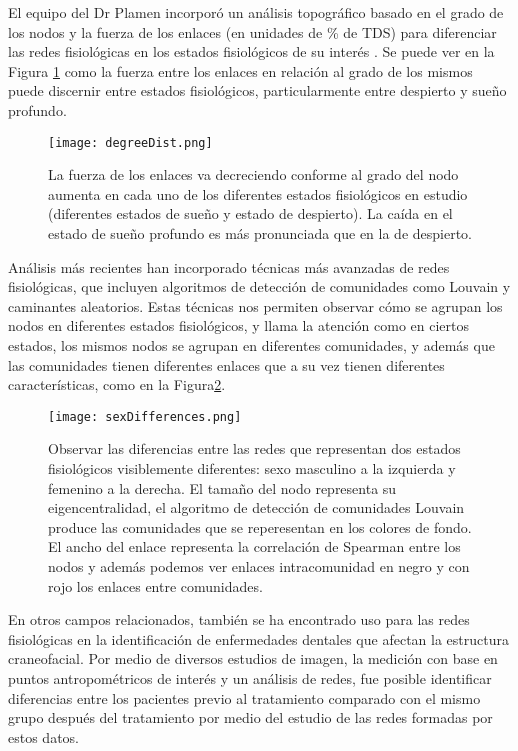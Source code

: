 \documentclass[twoside,twocolumn]{article}
\begin{document}
El equipo del Dr Plamen incorporó un análisis topográfico basado en el grado de los nodos y la fuerza de los enlaces (en unidades de \% de TDS) para diferenciar las redes fisiológicas en los estados fisiológicos de su interés \cite{bashan2012network}\cite{2015Plasticity}.
Se puede ver en la Figura \ref{fig:degreeDist} como la fuerza entre los enlaces en relación al grado de los mismos puede discernir entre estados fisiológicos, particularmente entre despierto y sueño profundo.

\begin{figure}[H]
  \texttt{[image: degreeDist.png]}
  \caption{La fuerza de los enlaces va decreciendo conforme al grado del nodo aumenta en cada uno de los diferentes estados fisiológicos en estudio (diferentes estados de sueño y estado de despierto). La caída en el estado de sueño profundo es más pronunciada que en la de despierto.}
  \label{fig:degreeDist}
\end{figure}

Análisis más recientes han incorporado técnicas más avanzadas de redes fisiológicas, que incluyen algoritmos de detección de comunidades como Louvain y caminantes aleatorios\cite{barajas2021sex}\cite{barajas2021physiological}\cite{easton2020metabolic}\cite{chmiel2014spreading}.
Estas técnicas nos permiten observar cómo se agrupan los nodos en diferentes estados fisiológicos, y llama la atención como en ciertos estados, los mismos nodos se agrupan en diferentes comunidades, y además que las comunidades tienen diferentes enlaces que a su vez tienen diferentes características, como en la Figura\ref{fig:sexDifferences}.

\begin{figure}
  \texttt{[image: sexDifferences.png]}
  \caption{Observar las diferencias entre las redes que representan dos estados fisiológicos visiblemente diferentes: sexo masculino a la izquierda y femenino a la derecha. El tamaño del nodo representa su eigencentralidad, el algoritmo de detección de comunidades Louvain produce las comunidades que se reperesentan en los colores de fondo. El ancho del enlace representa la correlación de Spearman entre los nodos y además podemos ver enlaces intracomunidad en negro y con rojo los enlaces entre comunidades.}
  \label{fig:sexDifferences}
\end{figure}

En otros campos relacionados, también se ha encontrado uso para las redes fisiológicas en la identificación de enfermedades dentales que afectan la estructura craneofacial\cites{scala2014complex}.
Por medio de diversos estudios de imagen, la medición con base en puntos antropométricos de interés y un análisis de redes, fue posible identificar diferencias entre los pacientes previo al tratamiento comparado con el mismo grupo después del tratamiento por medio del estudio de las redes formadas por estos datos.
\end{document}
